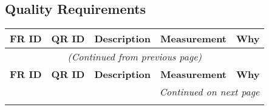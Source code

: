 \subsection{Quality Requirements}

\renewcommand{\arraystretch}{1.3} %

\begin{longtable}{|c|c|p{4.5cm}|p{3.5cm}|p{3.5cm}|}
    \hline
    \rowcolor{lightgray} \textbf{FR ID} & \textbf{QR ID} & \textbf{Description} & \textbf{Measurement} & \textbf{Why} \\
    \hline
    \endfirsthead

    \multicolumn{5}{c}{\textit{(Continued from previous page)}} \\
    \hline
    \rowcolor{lightgray} \textbf{FR ID} & \textbf{QR ID} & \textbf{Description} & \textbf{Measurement} & \textbf{Why} \\
    \hline
    \endhead

    \hline
    \multicolumn{5}{r}{\textit{Continued on next page}} \\
    \endfoot

    \hline
    \endlastfoot


\end{longtable}
